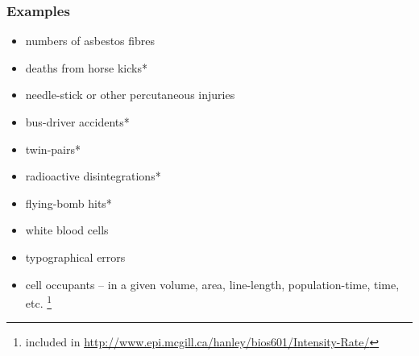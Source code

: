 \documentclass[10pt,handout]{beamer}\usepackage[]{graphicx}\usepackage[]{color}
\begin{document}
\begin{frame}
	\frametitle{Examples}
	
	\begin{itemize}
		\setlength\itemsep{0.5em}
		\item numbers of asbestos fibres
		\item deaths from horse kicks*
		\item needle-stick or other percutaneous injuries
		\item bus-driver accidents*
		\item twin-pairs*
		\item radioactive disintegrations*
		\item flying-bomb hits*
		\item white blood cells
		\item typographical errors
		\item cell occupants -- in a given volume, area, line-length, population-time, time, etc. 
		\footnote{\footnotesize * included in \url{http://www.epi.mcgill.ca/hanley/bios601/Intensity-Rate/}}
	\end{itemize}
\end{frame}
\end{document}
